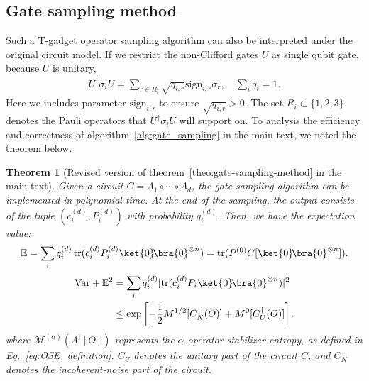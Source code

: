 \documentclass[aps,%
twocolumn,%
floatfix,%
pra,%
amsfonts,%
longbibliography,%
groupedaddress,%
superscriptaddress]{revtex4-2}%
\newtheorem{theorem}{Theorem}
\newcommand{\1}{\mathbbm{1}}
\begin{document}
\subsection{Gate sampling method}
Such a T-gadget operator sampling algorithm can also be interpreted under the original circuit model. 
If we restrict the non-Clifford gates $U$ as single qubit gate, because $U$ is unitary, 
 \begin{align}
     U^\dagger \sigma_i U= \sum_{r\in R_i} \sqrt{q_{i,r}} \text{sign}_{i,r} \sigma_r,\quad  \sum_i q_i = 1.
 \end{align}
 Here we includes parameter $\text{sign}_{i,r}$ to ensure $\sqrt{q_{i,r}} > 0$. The set $R_i \subset \{1,2,3\}$ denotes the Pauli operators that $ U^\dagger \sigma_i U$ will support on.
To analysis the efficiency and correctness of  algorithm~\ref{alg:gate_sampling} in the main text, we noted the theorem below.
\begin{theorem}[Revised version of theorem~\ref{theo:gate-sampling-method} in the main text] \label{theo:revised_gate-sampling-method}
 Given a circuit $C = \Lambda_1 \circ \cdots \circ \Lambda_{d}$, the gate sampling algorithm can be implemented in polynomial time. At the end of the sampling, the output consists of the tuple $(c_i^{(d)}, P_i^{(d)})$ with probability $q_i^{(d)}$. Then, we have the expectation value:
\begin{align}
    \mathbb{E} = \sum_{i} q_i^{(d)} \, \text{tr}(c_i^{(d)} P_i^{(d)} \ket{0}\!\bra{0}^{\otimes n}) = \text{tr}( P^{(0)} C[\ket{0}\!\bra{0}^{\otimes n}] ).
\end{align}
\color{red}
\begin{align}
    \text{Var} + \mathbb{E}^2 &= \sum_{i} q_i^{(d)} |\text{tr}(c_i^{(d)} P_i \ket{0}\!\bra{0}^{\otimes n})|^2 \\
    &\leq \exp\left[ -\frac{1}{2} M^{1/2}[C_N^\dagger(O)] + M^{0}[C_U^\dagger(O)] \right].
\end{align}
\color{black}
where $\mathcal{M}^{(\alpha)}({\Lambda}^\dagger[O])$ represents the $\alpha$-operator stabilizer entropy, as defined in Eq.~\eqref{eq:OSE_definition}. $C_U$ denotes the unitary part of the circuit $C$, and $C_N$ denotes the incoherent-noise part of the circuit.
\end{theorem}
\end{document}
